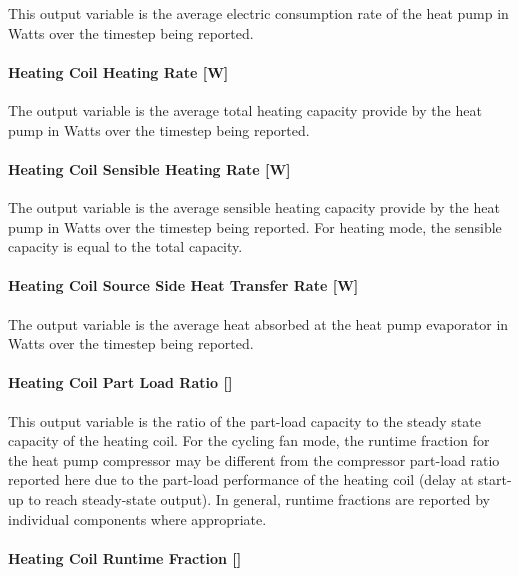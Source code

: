 This output variable is the average electric consumption rate of the heat pump in Watts over the timestep being reported.

\paragraph{Heating Coil Heating Rate {[}W{]}}\label{heating-coil-heating-rate-w-2}

The output variable is the average total heating capacity provide by the heat pump in Watts over the timestep being reported.

\paragraph{Heating Coil Sensible Heating Rate {[}W{]}}\label{heating-coil-sensible-heating-rate-w}

The output variable is the average sensible heating capacity provide by the heat pump in Watts over the timestep being reported. For heating mode, the sensible capacity is equal to the total capacity.

\paragraph{Heating Coil Source Side Heat Transfer Rate {[}W{]}}\label{heating-coil-source-side-heat-transfer-rate-w}

The output variable is the average heat absorbed at the heat pump evaporator in Watts over the timestep being reported.

\paragraph{Heating Coil Part Load Ratio {[]}}\label{heating-coil-part-load-ratio}

This output variable is the ratio of the part-load capacity to the steady state capacity of the heating coil. For the cycling fan mode, the runtime fraction for the heat pump compressor may be different from the compressor part-load ratio reported here due to the part-load performance of the heating coil (delay at start-up to reach steady-state output). In general, runtime fractions are reported by individual components where appropriate.

\paragraph{Heating Coil Runtime Fraction {[]}}\label{heating-coil-runtime-fraction-6}

